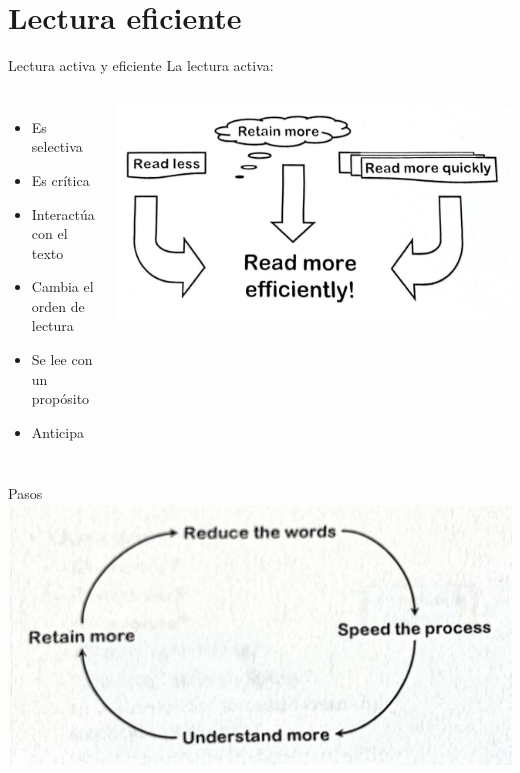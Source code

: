 \documentclass[
10pt,
aspectratio=169,
]{beamer}
\begin{document}
\section{Lectura eficiente}
\begin{frame}[c]{Lectura activa y eficiente}
La lectura activa:
\begin{columns}
\begin{itemize}
\item Es selectiva
\item Es cr\'itica
\item Interact\'ua con el texto
\item Cambia el orden de lectura
\item Se lee con un prop\'osito
\item Anticipa
\end{itemize}
\centering
\includegraphics[width=\textwidth]{fig1.jpeg}
\end{columns}
\end{frame}

\begin{frame}[c]{Pasos}
\centering
\includegraphics[width=\textwidth]{fig2.jpeg}
\end{frame}
\end{document}
